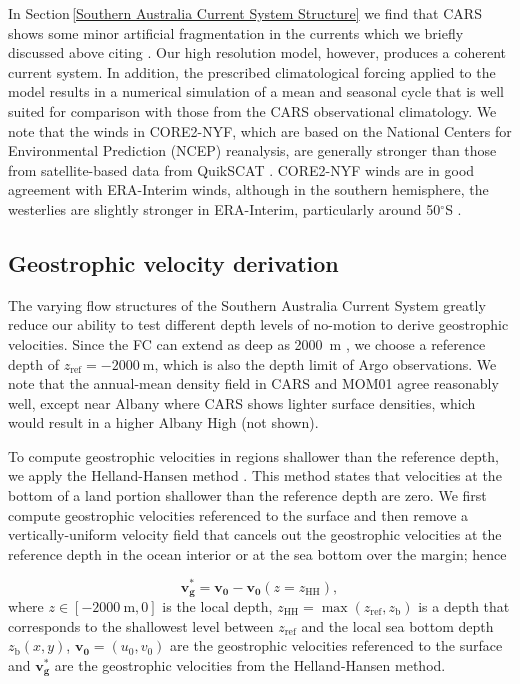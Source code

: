 \documentclass[preprint,3p,review,12pt]{elsarticle}
\renewcommand{\Vec}[1]{\mathbf{#1}}
\newcommand{\dg}{$^{\circ}$}
\newcommand{\sub}[1]{_{\text{#1}}}
\begin{document}
In Section\,\ref{Southern Australia Current System Structure} we find that CARS shows some minor artificial fragmentation in the currents which we briefly discussed above citing \citet{Ridgway2002}. Our high resolution model, however, produces a coherent current system. In addition, the prescribed climatological forcing applied to the model results in a  numerical simulation of a mean and seasonal cycle that is well suited for comparison with those from the CARS observational climatology.
We note that the winds in CORE2-NYF, which are based on the National Centers for Environmental Prediction (NCEP) reanalysis, are generally stronger than those from satellite-based data from QuikSCAT \citep{Large2009}. CORE2-NYF winds are in good agreement with ERA-Interim winds, although in the southern hemisphere, the westerlies are slightly stronger in ERA-Interim, particularly around 50\dg S \citep{Chaudhuri2013}.

\subsection{Geostrophic velocity derivation} \label{Geostrophic velocity derivation}
The varying flow structures of the Southern Australia Current System greatly reduce our ability to test different depth levels of no-motion to derive geostrophic velocities. Since the FC can extend as deep as \SI{2000}{\meter} \citep{Middleton2002}, we choose a reference depth of $z\sub{ref} = \SI{-2000}{\meter}$, which is also the depth limit of Argo observations. We note that the annual-mean density field in CARS and MOM01 agree reasonably well, except near Albany where CARS shows lighter surface densities, which would result in a higher Albany High (not shown).

To compute geostrophic velocities in regions shallower than the reference depth, we apply the Helland-Hansen method \citep{Helland-Hansen1934,Fomin1964}. This method states that velocities at the bottom of a land portion shallower than the reference depth are zero. We first compute geostrophic velocities referenced to the surface and then remove a vertically-uniform velocity field that cancels out the geostrophic velocities at the reference depth in the ocean interior or at the sea bottom over the margin; hence

\begin{equation}
\Vec{v\sub{g}^{*}} = \Vec{v\sub{0}} - \Vec{v\sub{0}}(z=z\sub{HH}),
\end{equation}
%
where $z \in [\SI{-2000}{\meter}, 0]$ is the local depth, $z\sub{HH} = \max(z\sub{ref},z\sub{b})$ is a depth that corresponds to the shallowest level between $z\sub{ref}$ and the local sea bottom depth $z\sub{b}(x,y)$, $\Vec{v\sub{0}}=(u\sub{0},v\sub{0})$ are the geostrophic velocities referenced to the surface and $\Vec{v\sub{g}^{*}}$ are the geostrophic velocities from the Helland-Hansen method.
\end{document}
